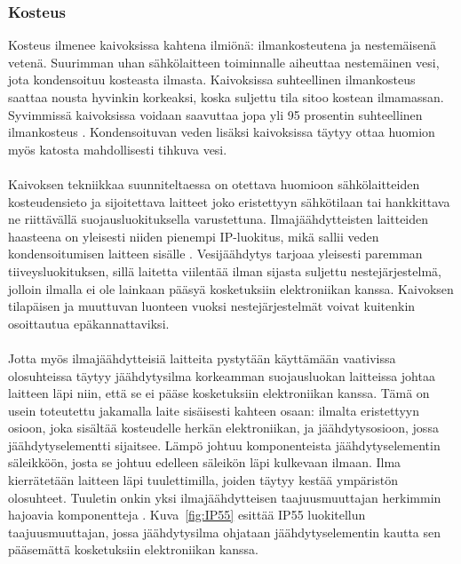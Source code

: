\documentclass[finnish,12pt,a4paper,pdftex,elec,utf8]{aaltothesis}
\begin{document}
\subsubsection{Kosteus}
Kosteus ilmenee kaivoksissa kahtena ilmiönä: ilmankosteutena ja nestemäisenä vetenä. Suurimman uhan sähkölaitteen toiminnalle aiheuttaa nestemäinen vesi, jota kondensoituu kosteasta ilmasta. Kaivoksissa suhteellinen ilmankosteus saattaa nousta hyvinkin korkeaksi, koska suljettu tila sitoo kostean ilmamassan.  Syvimmissä kaivoksissa voidaan saavuttaa jopa yli 95 prosentin suhteellinen ilmankosteus \cite{manchao}. Kondensoituvan veden lisäksi kaivoksissa täytyy ottaa huomion myös katosta mahdollisesti tihkuva vesi.
\\\\
Kaivoksen tekniikkaa suunniteltaessa on otettava huomioon sähkölaitteiden kosteudensieto ja sijoitettava laitteet joko eristettyyn sähkötilaan tai hankkittava ne riittävällä suojausluokituksella varustettuna. Ilmajäähdytteisten laitteiden haasteena on yleisesti niiden pienempi IP-luokitus, mikä sallii veden kondensoitumisen laitteen sisälle \cite{Pallasmaa}. Vesijäähdytys tarjoaa yleisesti paremman tiiveysluokituksen, sillä laitetta viilentää ilman sijasta suljettu nestejärjestelmä, jolloin ilmalla ei ole lainkaan pääsyä kosketuksiin elektroniikan kanssa. Kaivoksen tilapäisen ja muuttuvan luonteen vuoksi nestejärjestelmät voivat kuitenkin osoittautua epäkannattaviksi.
\\\\
Jotta myös ilmajäähdytteisiä laitteita pystytään käyttämään vaativissa olosuhteissa täytyy jäähdytysilma korkeamman suojausluokan laitteissa johtaa laitteen läpi niin, että se ei pääse kosketuksiin elektroniikan kanssa. Tämä on usein toteutettu jakamalla laite sisäisesti kahteen osaan: ilmalta eristettyyn osioon, joka sisältää kosteudelle herkän elektroniikan, ja jäähdytysosioon, jossa jäähdytyselementti  sijaitsee.  Lämpö johtuu komponenteista jäähdytyselementin säleikköön, josta se johtuu edelleen säleikön läpi kulkevaan ilmaan. Ilma kierrätetään laitteen läpi tuulettimilla, joiden täytyy kestää ympäristön olosuhteet. Tuuletin onkin yksi ilmajäähdytteisen taajuusmuuttajan herkimmin hajoavia komponentteja \cite{Muttilainen}. Kuva~\ref{fig:IP55} esittää IP55 luokitellun taajuusmuuttajan, jossa jäähdytysilma ohjataan jäähdytyselementin kautta sen pääsemättä kosketuksiin elektroniikan kanssa.
\end{document}
